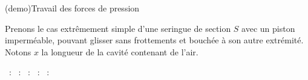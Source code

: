 \documentclass[../../main/main.tex]{subfiles}
\begin{document}
\begin{tcb*}[breakable](demo){Travail des forces de pression}
	\begin{isd}[righthand ratio=.4]
		Prenons le cas extrêmement simple d'une seringue de section $S$ avec un piston
		imperméable, pouvant glisser sans frottements et bouchée à son autre
		extrémité. Notons $x$ la longueur de la cavité contenant de l'air.
		\tcblower
		\begin{center}
		\end{center}
	\end{isd}
	\tcblower
	\begin{itemize}
		~: 
		~: 
		~: 
		~: 
		~:
		\leavevmode\vspace*{-15pt}\relax
		\vspace{-15pt}
	\end{itemize}
\end{tcb*}
\end{document}
